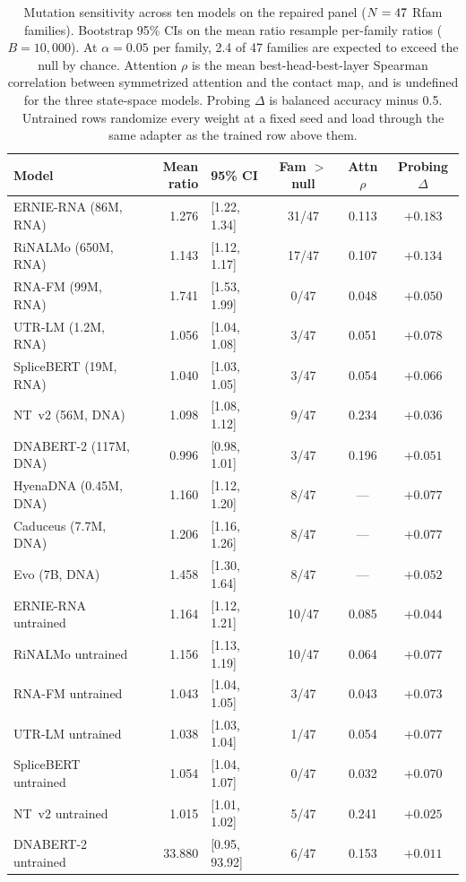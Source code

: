 \begin{table}[htbp]
\centering
\caption{Mutation sensitivity across ten models on the repaired panel
($N = 47{}$ Rfam families). Bootstrap 95\% CIs on the mean ratio
resample per-family ratios ($B = 10{,}000$).
At $\alpha = 0.05$ per family, 2.4 of 47
families are expected to exceed the null by chance. Attention $\rho$ is the mean
best-head-best-layer Spearman correlation between symmetrized attention and the
contact map, and is undefined for the three state-space models. Probing $\Delta$
is balanced accuracy minus 0.5. Untrained rows randomize every weight at a fixed
seed and load through the same adapter as the trained row above them.}
\label{tab:rung1}
\small
\begin{tabular}{lrlccc}
\toprule
\textbf{Model} & \textbf{Mean ratio} & \textbf{95\% CI} & \textbf{Fam $>$ null} & \textbf{Attn $\rho$} & \textbf{Probing $\Delta$} \\
\midrule
ERNIE-RNA (86M, RNA)       & 1.276 & [1.22, 1.34] & 31/47 & 0.113 & $+0.183$ \\
RiNALMo (650M, RNA)        & 1.143 & [1.12, 1.17] & 17/47 & 0.107 & $+0.134$ \\
RNA-FM (99M, RNA)          & 1.741 & [1.53, 1.99] & 0/47 & 0.048 & $+0.050$ \\
UTR-LM (1.2M, RNA)         & 1.056 & [1.04, 1.08] & 3/47 & 0.051 & $+0.078$ \\
SpliceBERT (19M, RNA)      & 1.040 & [1.03, 1.05] & 3/47 & 0.054 & $+0.066$ \\
NT~v2 (56M, DNA)           & 1.098 & [1.08, 1.12] & 9/47 & 0.234 & $+0.036$ \\
DNABERT-2 (117M, DNA)      & 0.996 & [0.98, 1.01] & 3/47 & 0.196 & $+0.051$ \\
HyenaDNA (0.45M, DNA)      & 1.160 & [1.12, 1.20] & 8/47 & --- & $+0.077$ \\
Caduceus (7.7M, DNA)       & 1.206 & [1.16, 1.26] & 8/47 & --- & $+0.077$ \\
Evo (7B, DNA)              & 1.458 & [1.30, 1.64] & 8/47 & --- & $+0.052$ \\
\midrule
ERNIE-RNA untrained        & 1.164 & [1.12, 1.21] & 10/47 & 0.085 & $+0.044$ \\
RiNALMo untrained          & 1.156 & [1.13, 1.19] & 10/47 & 0.064 & $+0.077$ \\
RNA-FM untrained           & 1.043 & [1.04, 1.05] & 3/47 & 0.043 & $+0.073$ \\
UTR-LM untrained           & 1.038 & [1.03, 1.04] & 1/47 & 0.054 & $+0.077$ \\
SpliceBERT untrained       & 1.054 & [1.04, 1.07] & 0/47 & 0.032 & $+0.070$ \\
NT~v2 untrained            & 1.015 & [1.01, 1.02] & 5/47 & 0.241 & $+0.025$ \\
DNABERT-2 untrained        & 33.880 & [0.95, 93.92] & 6/47 & 0.153 & $+0.011$ \\
\bottomrule
\end{tabular}
\end{table}
